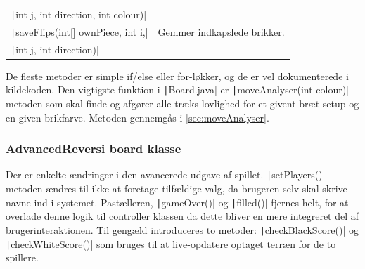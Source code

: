 \begin{table}[H]
\begin{tabular}{ll}
        \quad \texttt|int j, int direction, int colour)|    &                                                                       \\
        \texttt|saveFlips(int[] ownPiece, int i,|           & Gemmer indkapslede brikker.                                           \\
        \quad \texttt|int j, int direction)|                &                                                                       \\
        \bottomrule
    \end{tabular}
\end{table}
De fleste metoder er simple if/else eller for-løkker, og de er vel dokumenterede i kildekoden.\newline
Den vigtigste funktion i \texttt|Board.java| er \texttt|moveAnalyser(int colour)| metoden som skal finde og afgører alle træks lovlighed for et givent bræt setup og en given brikfarve. Metoden gennemgås i \cref{sec:moveAnalyser}.
\subsubsection{AdvancedReversi board klasse}
Der er enkelte ændringer i den avancerede udgave af spillet. \texttt|setPlayers()| metoden ændres til ikke at foretage tilfældige valg, da brugeren selv skal skrive navne ind i systemet. Pastælleren, \texttt|gameOver()| og \texttt|filled()| fjernes helt, for at overlade denne logik til controller klassen da dette bliver en mere integreret del af brugerinteraktionen. Til gengæld introduceres to metoder: \texttt|checkBlackScore()| og \texttt|checkWhiteScore()| som bruges til at live-opdatere optaget terræn for de to spillere.
